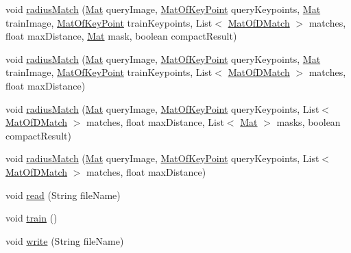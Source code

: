 \begin{DoxyCompactItemize}
\item 
void \mbox{\hyperlink{classorg_1_1opencv_1_1features2d_1_1_generic_descriptor_matcher_acb8573df1d9182c66a2a22298fa29ca9}{radius\+Match}} (\mbox{\hyperlink{classorg_1_1opencv_1_1core_1_1_mat}{Mat}} query\+Image, \mbox{\hyperlink{classorg_1_1opencv_1_1core_1_1_mat_of_key_point}{Mat\+Of\+Key\+Point}} query\+Keypoints, \mbox{\hyperlink{classorg_1_1opencv_1_1core_1_1_mat}{Mat}} train\+Image, \mbox{\hyperlink{classorg_1_1opencv_1_1core_1_1_mat_of_key_point}{Mat\+Of\+Key\+Point}} train\+Keypoints, List$<$ \mbox{\hyperlink{classorg_1_1opencv_1_1core_1_1_mat_of_d_match}{Mat\+Of\+D\+Match}} $>$ matches, float max\+Distance, \mbox{\hyperlink{classorg_1_1opencv_1_1core_1_1_mat}{Mat}} mask, boolean compact\+Result)
\item 
void \mbox{\hyperlink{classorg_1_1opencv_1_1features2d_1_1_generic_descriptor_matcher_a517eb5459d58a1925807ac24941e7961}{radius\+Match}} (\mbox{\hyperlink{classorg_1_1opencv_1_1core_1_1_mat}{Mat}} query\+Image, \mbox{\hyperlink{classorg_1_1opencv_1_1core_1_1_mat_of_key_point}{Mat\+Of\+Key\+Point}} query\+Keypoints, \mbox{\hyperlink{classorg_1_1opencv_1_1core_1_1_mat}{Mat}} train\+Image, \mbox{\hyperlink{classorg_1_1opencv_1_1core_1_1_mat_of_key_point}{Mat\+Of\+Key\+Point}} train\+Keypoints, List$<$ \mbox{\hyperlink{classorg_1_1opencv_1_1core_1_1_mat_of_d_match}{Mat\+Of\+D\+Match}} $>$ matches, float max\+Distance)
\item 
void \mbox{\hyperlink{classorg_1_1opencv_1_1features2d_1_1_generic_descriptor_matcher_a11a5917274ec694e43597b9fe9b19c4d}{radius\+Match}} (\mbox{\hyperlink{classorg_1_1opencv_1_1core_1_1_mat}{Mat}} query\+Image, \mbox{\hyperlink{classorg_1_1opencv_1_1core_1_1_mat_of_key_point}{Mat\+Of\+Key\+Point}} query\+Keypoints, List$<$ \mbox{\hyperlink{classorg_1_1opencv_1_1core_1_1_mat_of_d_match}{Mat\+Of\+D\+Match}} $>$ matches, float max\+Distance, List$<$ \mbox{\hyperlink{classorg_1_1opencv_1_1core_1_1_mat}{Mat}} $>$ masks, boolean compact\+Result)
\item 
void \mbox{\hyperlink{classorg_1_1opencv_1_1features2d_1_1_generic_descriptor_matcher_a435e2b77834a7a4bb26c53a7e8b53fd5}{radius\+Match}} (\mbox{\hyperlink{classorg_1_1opencv_1_1core_1_1_mat}{Mat}} query\+Image, \mbox{\hyperlink{classorg_1_1opencv_1_1core_1_1_mat_of_key_point}{Mat\+Of\+Key\+Point}} query\+Keypoints, List$<$ \mbox{\hyperlink{classorg_1_1opencv_1_1core_1_1_mat_of_d_match}{Mat\+Of\+D\+Match}} $>$ matches, float max\+Distance)
\item 
void \mbox{\hyperlink{classorg_1_1opencv_1_1features2d_1_1_generic_descriptor_matcher_ace5615a832b9156b6f934ae1b3351753}{read}} (String file\+Name)
\item 
void \mbox{\hyperlink{classorg_1_1opencv_1_1features2d_1_1_generic_descriptor_matcher_a6e18cfac8850372f13893af1534a6570}{train}} ()
\item 
void \mbox{\hyperlink{classorg_1_1opencv_1_1features2d_1_1_generic_descriptor_matcher_afe6a58bb4c1210dd0701d0514fa58d5a}{write}} (String file\+Name)
\end{DoxyCompactItemize}
